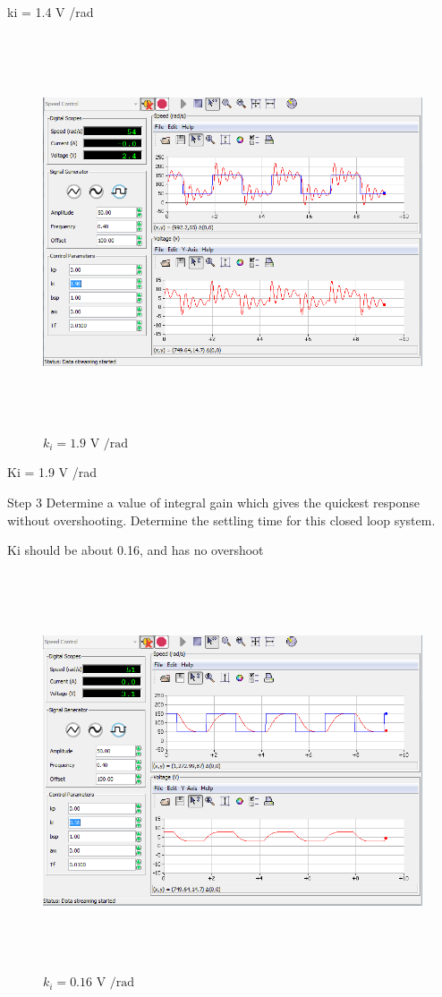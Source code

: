 \documentclass[]{article}
\begin{document}
ki = 1.4 V /rad

\begin{figure}\includegraphics[width=6.50000in,height=4.61111in]{media/image47.png} \caption{$k_i = \text{1.9 V /rad}$} \end{figure}

Ki = 1.9 V /rad

Step 3 Determine a value of integral gain which gives the quickest
response without overshooting. Determine the settling time for this
closed loop system.

Ki should be about 0.16, and has no overshoot

\begin{figure}\includegraphics[width=6.50000in,height=4.62500in]{media/image40.png} \caption{$k_i = \text{0.16 V /rad}$} \end{figure}
\end{document}
